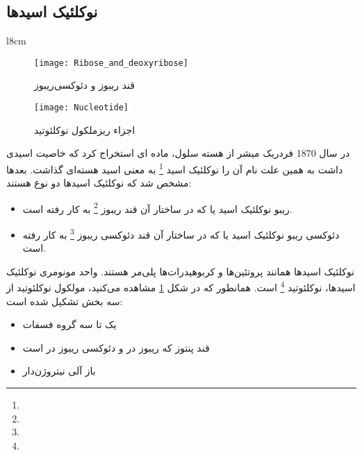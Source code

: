 \pagebreak
\subsection{نوکلئیک اسید‌ها}

\begin{wrapfigure}{l}{8cm}
	\centering
	
	\begin{subfigure}[b]{8cm}
		\centering
		\texttt{[image: Ribose\_and\_deoxyribose]}
		\caption{قند ریبوز و دئوکسی‌ریبوز}	
	\end{subfigure}
	\begin{subfigure}[b]{8cm}
		\centering
		\texttt{[image: Nucleotide]}
		\caption{اجزاء ریزملکول نوکلئوتید}
		\label{figure:Nucleotide}
	\end{subfigure}
	
\end{wrapfigure}

در سال 1870 فردریک میشر از هسته سلول، ماده ای استخراج کرد که خاصیت اسیدی داشت به همین علت نام آن را نوکلئیک اسید
\footnote{}
به معنی اسید هسته‌ای گذاشت. بعد‌ها مشخص شد که نوکلئیک اسید‌ها دو نوع هستند:
\begin{itemize}
\item ریبو نوکلئیک اسید یا 
که در ساختار آن قند ریبوز
\footnote{}
 به کار رفته است.
\item دئوکسی ریبو نوکلئیک اسید یا
که در ساختار آن قند دئوکسی ریبوز
\footnote{}
 به کار رفته است.
\end{itemize}

نوکلئیک اسید‌ها همانند پروتئین‌ها و کربوهیدرات‌ها پلی‌مر هستند. واحد‌ مونومری نوکلئیک اسید‌ها، نوکلئوتید
\footnote{}
است.
همانطور که در شکل
\ref{figure:Nucleotide}
مشاهده می‌کنید، مولکول نوکلئوتید از سه بخش تشکیل شده است:
\begin{itemize}
\item  یک تا سه گروه فسفات
\item  قند پنتوز که ریبوز در
و
دئوکسی ریبوز در
است
\item  باز آلی نیتروژن‌دار
\end{itemize}

